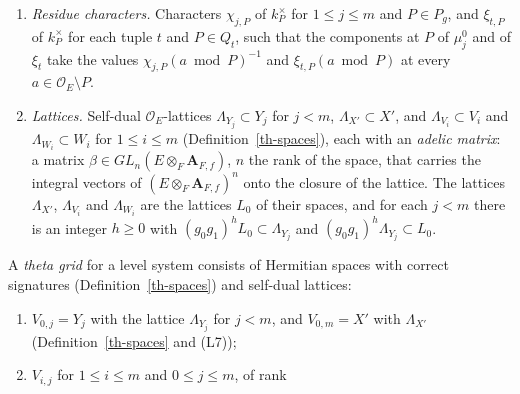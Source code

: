 \begin{definition}
\begin{enumerate}
\item[(L6)] \emph{Residue characters.} Characters $\chi_{j,P}$ of $k_P^\times$
  for $1\leq j\leq m$ and $P\in P_g$, and $\xi_{t,P}$ of $k_P^\times$ for each
  tuple $t$ and $P\in Q_t$, such that the components at $P$ of $\mu^0_j$ and
  of $\xi_t$ take the values $\chi_{j,P}(a\bmod P)^{-1}$ and
  $\xi_{t,P}(a\bmod P)$ at every $a\in\mathcal O_E\setminus P$.
\item[(L7)] \emph{Lattices.} Self-dual $\mathcal O_E$-lattices
  $\Lambda_{Y_j}\subset Y_j$ for $j<m$, $\Lambda_{X'}\subset X'$, and
  $\Lambda_{V_i}\subset V_i$ and $\Lambda_{W_i}\subset W_i$ for $1\leq i\leq m$
  (Definition~\ref{th-spaces}), each with an \emph{adelic matrix}: a matrix
  $\beta\in GL_n(E\otimes_F\mathbf A_{F,f})$, $n$ the rank of the space, that
  carries the integral vectors of $(E\otimes_F\mathbf A_{F,f})^n$ onto the
  closure of the lattice. The lattices $\Lambda_{X'}$, $\Lambda_{V_i}$ and
  $\Lambda_{W_i}$ are the lattices $L_0$ of their spaces, and for each $j<m$
  there is an integer $h\geq0$ with $(g_0g_1)^hL_0\subset\Lambda_{Y_j}$ and
  $(g_0g_1)^h\Lambda_{Y_j}\subset L_0$.
\end{enumerate}
A \emph{theta grid} for a level system consists of Hermitian spaces with
correct signatures (Definition~\ref{th-spaces}) and self-dual lattices:
\begin{enumerate}
\item $V_{0,j}=Y_j$ with the lattice $\Lambda_{Y_j}$ for $j<m$, and
  $V_{0,m}=X'$ with $\Lambda_{X'}$ (Definition~\ref{th-spaces} and (L7));
\item $V_{i,j}$ for $1\leq i\leq m$ and $0\leq j\leq m$, of rank

\end{enumerate}
\end{definition}
